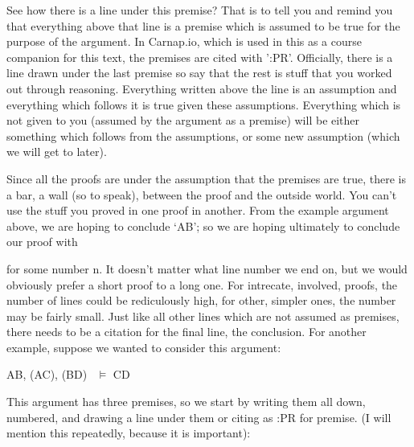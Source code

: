 \begin{fitchproof}
\end{fitchproof}

See how there is a line under this premise? That is to tell you and remind you that everything above that line is a premise which is assumed to be true for the purpose of the argument. In Carnap.io, which is used in this as a course companion for this text, the premises are cited with ':PR'. Officially, there is a line drawn under the last premise so say that the rest is stuff that you worked out through reasoning. Everything written above the line is an assumption and everything which follows it is true given these assumptions. Everything which is not given to you (assumed by the argument as a premise) will be either something which follows from the assumptions, or some new assumption (which we will get to later).

Since all the proofs are under the assumption that the premises are true, there is a bar, a wall (so to speak), between the proof and the outside world. You can't use the stuff you proved in one proof in another. From the example argument above, we are hoping to conclude ‘\enot A\eand \enot B’; so we are hoping ultimately to conclude our proof with

\begin{fitchproof}
\end{fitchproof}

for some number n. It doesn’t matter what line number we end on, but we would obviously prefer a short proof to a long one. For intrecate, involved, proofs, the number of lines could be rediculously high, for other, simpler ones, the number may be fairly small. Just like all other lines which are not assumed as premises, there needs to be a citation for the final line, the conclusion. For another example, suppose we wanted to consider this argument:
\begin{center}
A\eor B, \enot (A\eand C), \enot (B\eand \enot D)  $\vDash$ \enot C\eor D
\end{center}
This argument has three premises, so we start by writing them all down, numbered, and drawing a line under them or citing as :PR for premise. (I will mention this repeatedly, because it is important):

\begin{fitchproof}
\end{fitchproof}

